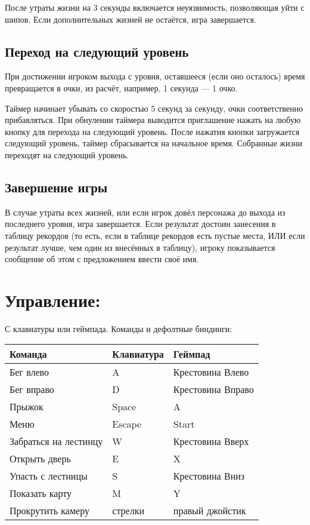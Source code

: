\documentclass[12pt,a4paper,fullpage]{article}
\begin{document}
После утраты жизни на 3 секунды включается неуязвимость, позволяющая уйти с шипов. Если дополнительных жизней не остаётся, игра завершается.
\subsection{Переход на следующий уровень}
При достижении игроком выхода с уровня, оставшееся (если оно осталось) время превращается в очки, из расчёт, например, 1 секунда --- 1 очко.

Таймер начинает убывать со скоростью 5 секунд за секунду, очки соответственно прибавляться. При обнулении таймера выводится приглашение нажать на любую кнопку для перехода на следующий уровень. После нажатия кнопки загружается следующий уровень, таймер сбрасывается на начальное время. Собранные жизни переходят на следующий уровень.
\subsection{Завершение игры}
В случае утраты всех жизней, или если игрок довёл персонажа до выхода из последнего уровня, игра завершается. Если результат достоин занесения в таблицу рекордов (то есть, если в таблице рекордов есть пустые места, ИЛИ если результат лучше, чем один из внесённых в таблицу), игроку показывается сообщение об этом с предложением ввести своё имя.
\section{Управление:}
С клавиатуры или геймпада.
Команды и дефолтные биндинги:\\
\begin{tabular}{|p{6cm}|p{2.5cm}|p{3cm}|}
\hline
Команда & Клавиатура & Геймпад\\
\hline
Бег влево & A & Крестовина Влево \\
\hline
Бег вправо & D & Крестовина Вправо \\
\hline
Прыжок & Space & A \\
\hline
Меню & Escape & Start \\
\hline
Забраться на лестинцу & W & Крестовина Вверх \\
\hline
Открыть дверь & E & X \\
\hline
Упасть с лестницы & S & Крестовина Вниз \\
\hline
Показать карту & M & Y \\
\hline
Прокрутить камеру & стрелки & правый джойстик \\
\hline
\end{tabular}
\end{document}
